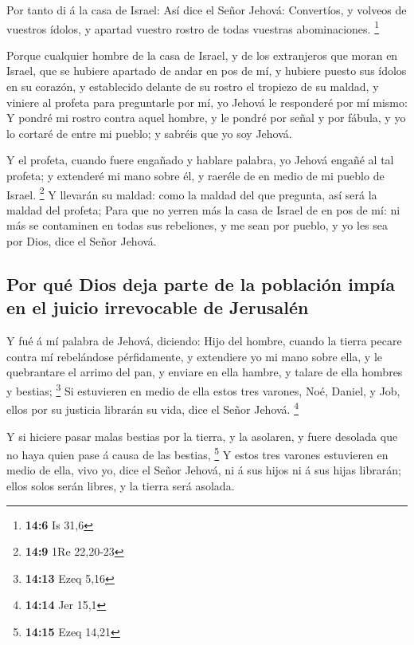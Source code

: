  Por tanto di á la casa de Israel: Así dice el Señor
Jehová: Convertíos, y volveos de vuestros ídolos, y apartad vuestro
rostro de todas vuestras abominaciones. \footnote{\textbf{14:6} Is 31,6}

 Porque cualquier hombre de la casa de Israel, y de los
extranjeros que moran en Israel, que se hubiere apartado de andar en pos
de mí, y hubiere puesto sus ídolos en su corazón, y establecido delante
de su rostro el tropiezo de su maldad, y viniere al profeta para
preguntarle por mí, yo Jehová le responderé por mí mismo: 
Y pondré mi rostro contra aquel hombre, y le pondré por señal y por
fábula, y yo lo cortaré de entre mi pueblo; y sabréis que yo soy Jehová.

 Y el profeta, cuando fuere engañado y hablare palabra, yo
Jehová engañé al tal profeta; y extenderé mi mano sobre él, y raeréle de
en medio de mi pueblo de Israel. \footnote{\textbf{14:9} 1Re 22,20-23}
 Y llevarán su maldad: como la maldad del que pregunta,
así será la maldad del profeta;  Para que no yerren más
la casa de Israel de en pos de mí: ni más se contaminen en todas sus
rebeliones, y me sean por pueblo, y yo les sea por Dios, dice el Señor
Jehová.

\hypertarget{por-quuxe9-dios-deja-parte-de-la-poblaciuxf3n-impuxeda-en-el-juicio-irrevocable-de-jerusaluxe9n}{%
\subsection{Por qué Dios deja parte de la población impía en el juicio
irrevocable de
Jerusalén}\label{por-quuxe9-dios-deja-parte-de-la-poblaciuxf3n-impuxeda-en-el-juicio-irrevocable-de-jerusaluxe9n}}

 Y fué á mí palabra de Jehová, diciendo: 
Hijo del hombre, cuando la tierra pecare contra mí rebelándose
pérfidamente, y extendiere yo mi mano sobre ella, y le quebrantare el
arrimo del pan, y enviare en ella hambre, y talare de ella hombres y
bestias; \footnote{\textbf{14:13} Ezeq 5,16}  Si
estuvieren en medio de ella estos tres varones, Noé, Daniel, y Job,
ellos por su justicia librarán su vida, dice el Señor Jehová.
\footnote{\textbf{14:14} Jer 15,1}

 Y si hiciere pasar malas bestias por la tierra, y la
asolaren, y fuere desolada que no haya quien pase á causa de las
bestias, \footnote{\textbf{14:15} Ezeq 14,21}  Y estos
tres varones estuvieren en medio de ella, vivo yo, dice el Señor Jehová,
ni á sus hijos ni á sus hijas librarán; ellos solos serán libres, y la
tierra será asolada.

